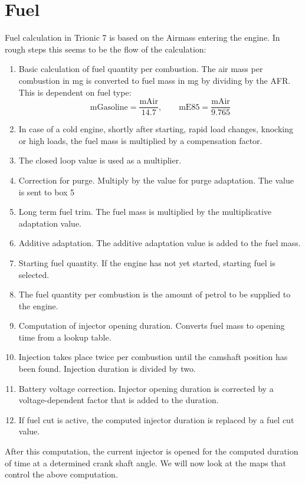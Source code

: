 \documentclass[11pt,a4paper]{book}
\begin{document}
\section{Fuel}
Fuel calculation in Trionic 7 is based on the Airmass entering the engine. In
rough steps this seems to be the flow of the calculation:

\begin{enumerate}
    \item Basic calculation of fuel quantity per combustion. The air mass per
        combustion in \si{\milli\gram} is converted to fuel mass in
        \si{\milli\gram} by dividing by the AFR. This is dependent on fuel type:
        \begin{equation}
            \text{mGasoline}=\frac{\text{mAir}}{14.7}, \qquad
            \text{mE85}=\frac{\text{mAir}}{9.765}
        \end{equation}
    \item In case of a cold engine, shortly after starting, rapid load changes,
        knocking or high loads, the fuel mass is multiplied by a compensation
        factor.
    \item The closed loop value is used as a multiplier.
    \item Correction for purge. Multiply by the value for purge adaptation. The
        value is sent to box 5
    \item Long term fuel trim. The fuel mass is multiplied by the multiplicative
        adaptation value.
    \item Additive adaptation. The additive adaptation value is added to the
        fuel mass.
    \item Starting fuel quantity. If the engine has not yet started, starting fuel is
        selected.
    \item The fuel quantity per combustion is the amount of petrol to be
        supplied to the engine.
    \item Computation of injector opening duration. Converts fuel mass to
        opening time from a lookup table.
    \item Injection takes place twice per combustion until the
        camshaft position has been found. Injection duration
        is divided by two.
    \item Battery voltage correction. Injector opening duration is corrected
        by a voltage-dependent factor that is added to the duration.
    \item If fuel cut is active, the computed injector duration is replaced by a
        fuel cut value.
\end{enumerate}
After this computation, the current injector is opened for the computed duration
of time at a determined crank shaft angle. We will now look at the maps that
control the above computation.
\end{document}
